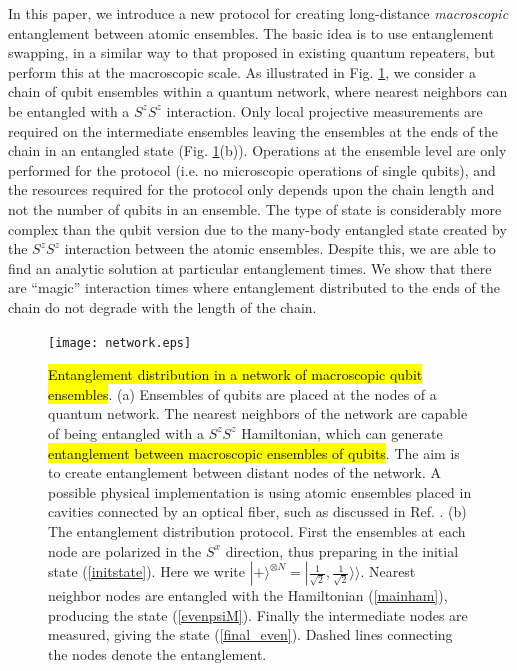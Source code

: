 \documentclass{WileyMSP-template}
\begin{document}
In this paper, we introduce a new protocol for creating long-distance {\it macroscopic} entanglement between atomic ensembles. The basic idea is to use entanglement swapping, in a similar way to that proposed in existing quantum repeaters, but perform this at the macroscopic scale. As illustrated in Fig. \ref{fig1}, we consider a chain of qubit ensembles within a quantum network, where nearest neighbors can be entangled with a $S^z S^z$ interaction.  Only local projective measurements are required on the intermediate ensembles leaving the ensembles at the ends of the chain in an entangled state (Fig. \ref{fig1}(b)).  Operations at the ensemble level are only performed for the protocol (i.e. no microscopic operations of single qubits), and the resources required for the protocol only depends upon the chain length and not the number of qubits in an ensemble.
The type of state is considerably more complex than the qubit version due to the many-body entangled state created by the $S^z S^z$ interaction between the atomic ensembles. Despite this, we are able to find an analytic solution at particular entanglement times.  We show that there are ``magic'' interaction times  where entanglement distributed to the ends of the chain do not degrade with the length of the chain.



\begin{figure}[t]
\centering
\texttt{[image: network.eps]}
\caption{\label{fig1}
\hl{Entanglement distribution in a network of macroscopic qubit ensembles}.  (a) Ensembles of qubits are placed at the nodes of a quantum network.  The nearest neighbors of the network are capable of being entangled with a $ S^z S^z $ Hamiltonian, which can generate \hl{entanglement between macroscopic ensembles of qubits}.  The aim is to create entanglement between distant nodes of the network.  A possible physical implementation is using atomic ensembles placed in cavities connected by an optical fiber, such as discussed in Ref. \cite{pyrkov2013entanglement}.
(b) The entanglement distribution protocol.  First the ensembles at each node are polarized in the $ S^x $ direction, thus preparing in the initial state (\ref{initstate}).  Here we write $ | + \rangle^{\otimes N } = | \frac{1}{\sqrt{2}}, \frac{1}{\sqrt{2}}
\rangle \rangle $. Nearest neighbor nodes are entangled with the Hamiltonian (\ref{mainham}), producing the state (\ref{evenpsiM}).  Finally the intermediate nodes are measured, giving the state (\ref{final_even}). Dashed lines connecting the nodes denote the entanglement.    }
\end{figure}
\end{document}
